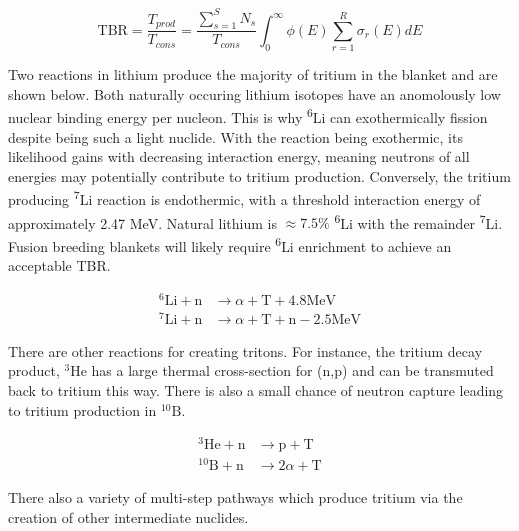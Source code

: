 \begin{equation}
  \label{eq:tbr}
  \mathrm{TBR} = \frac{T_{prod}}{T_{cons}} = \frac{\sum_{s=1}^{S} N_{s}}{T_{cons}} \int_{0}^{\infty} \phi(E) \sum_{r=1}^{R} \sigma_{r}(E) dE
\end{equation}

Two reactions in lithium produce the majority of tritium in the blanket and are shown below. Both naturally occuring lithium isotopes have an anomolously low nuclear binding energy per nucleon. This is why \textsuperscript{6}Li can exothermically fission despite being such a light nuclide. With the reaction being exothermic, its likelihood gains with decreasing interaction energy, meaning neutrons of all energies may potentially contribute to tritium production. Conversely, the tritium producing \textsuperscript{7}Li reaction is endothermic, with a threshold interaction energy of approximately 2.47 MeV. Natural lithium is $\approx 7.5\%$ \textsuperscript{6}Li with the remainder \textsuperscript{7}Li. Fusion breeding blankets will likely require \textsuperscript{6}Li enrichment to achieve an acceptable TBR.

\begin{equation}
\begin{split}
  ^{6}\mathrm{Li} + \mathrm{n} & \rightarrow \alpha + \mathrm{T} + 4.8\mathrm{MeV} \\
  ^{7}\mathrm{Li} + \mathrm{n} & \rightarrow \alpha + \mathrm{T} + \mathrm{n} - 2.5\mathrm{MeV}
\end{split}
\end{equation}

There are other reactions for creating tritons. For instance, the tritium decay product, $^{3}\mathrm{He}$ has a large thermal cross-section for (n,p) and can be transmuted back to tritium this way. There is also a small chance of neutron capture leading to tritium production in $^{10}\mathrm{B}$.

\begin{equation}
\begin{split}
  ^{3}\mathrm{He} + \mathrm{n} & \rightarrow \mathrm{p} + \mathrm{T} \\
  ^{10}\mathrm{B} + \mathrm{n} & \rightarrow 2\alpha + \mathrm{T}
\end{split}
\end{equation}

There also a variety of multi-step pathways which produce tritium via the creation of other intermediate nuclides. 


